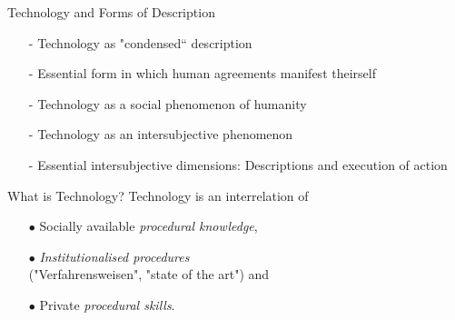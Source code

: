 \documentclass{beamer}
\begin{document}
\begin{frame}{Technology and Forms of Description}
  \begin{itemize}
  \item[-] Technology as "condensed“ description
  \item[-] Essential form in which human agreements manifest theirself
  \item[-] Technology as a social phenomenon of humanity
  \item[-] Technology as an intersubjective phenomenon
  \item[-] Essential intersubjective dimensions: Descriptions and execution of
    action
  \end{itemize}
  \begin{block}{What is Technology?} 
    Technology is an interrelation of
    \begin{itemize}
    \item[$\bullet$] Socially available \emph{procedural knowledge},
    \item[$\bullet$] \emph{Institutionalised
      procedures}\\ ("Verfahrensweisen", "state of the art") and
    \item[$\bullet$] Private \emph{procedural skills}.
    \end{itemize}
  \end{block}
\end{frame}
\end{document}
